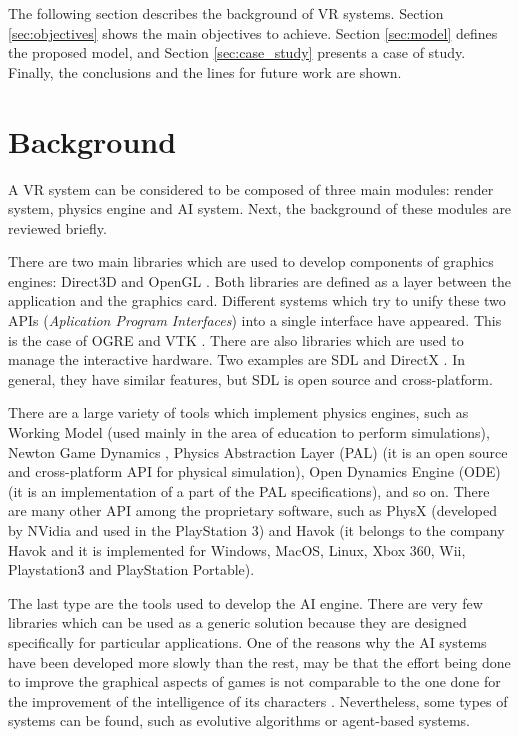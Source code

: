 \documentclass[10pt,journal,letterpaper,compsoc]{IEEEtran}
\begin{document}
The following section describes the background of VR systems. Section \ref{sec:objectives} shows
the main objectives to achieve. Section \ref{sec:model} defines the proposed model, and Section
\ref{sec:case_study} presents a case of study. Finally, the conclusions and the lines for future
work are shown.



\section{Background
\label{sec:background}}

A VR system can be considered to be composed of three main modules: render system, physics engine
and AI system. Next, the background of these modules are reviewed briefly.

There are two main libraries which are used to develop components of graphics engines: Direct3D
\cite{DirectX} and OpenGL \cite{OpenGL}. Both libraries are defined as a layer between the
application and the graphics card. Different systems which try to unify these two APIs
(\textit{Aplication Program Interfaces}) into a single interface have appeared. This is the case of
OGRE \cite{OGRE} and VTK \cite{VTK}. There are also libraries which are used to manage the
interactive hardware. Two examples are SDL \cite{SDL} and DirectX \cite{DirectX}. In general, they
have similar features, but SDL is open source and cross-platform.

There are a large variety of tools which implement physics engines, such as Working Model
\cite{WModel} (used mainly in the area of education to perform simulations), Newton Game
Dynamics \cite{NGDynamics}, Physics Abstraction Layer (PAL) \cite{PAL} (it is an open source and cross-platform API for physical simulation), Open Dynamics Engine (ODE) \cite{ODE} (it is an implementation of a part of the PAL specifications), and so on.  There are many other API among the proprietary software, such as PhysX \cite{Physx} (developed by NVidia
and used in the PlayStation 3) and Havok \cite{Havok} (it belongs to the company Havok and it is
implemented for Windows, MacOS, Linux, Xbox 360, Wii, Playstation3 and PlayStation Portable).

The last type are the tools used to develop the AI engine. There are very few libraries which can
be used as a generic solution because they are designed specifically for particular applications.
One of the reasons why the AI systems have been developed more slowly than the rest, may be that
the effort being done to improve the graphical aspects of games is not comparable to the one done
for the improvement of the intelligence of its characters \cite{Laird2001}. Nevertheless, some
types of systems can be found, such as evolutive algorithms or agent-based systems.
\end{document}

